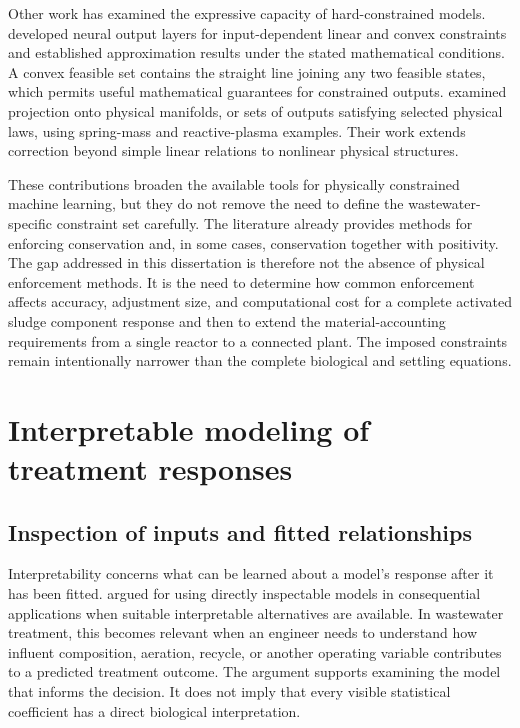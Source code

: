 Other work has examined the expressive capacity of hard-constrained models. \citet{Min2024} developed neural output layers for input-dependent linear and convex constraints and established approximation results under the stated mathematical conditions. A convex feasible set contains the straight line joining any two feasible states, which permits useful mathematical guarantees for constrained outputs. \citet{Valente2025} examined projection onto physical manifolds, or sets of outputs satisfying selected physical laws, using spring-mass and reactive-plasma examples. Their work extends correction beyond simple linear relations to nonlinear physical structures.

These contributions broaden the available tools for physically constrained machine learning, but they do not remove the need to define the wastewater-specific constraint set carefully. The literature already provides methods for enforcing conservation and, in some cases, conservation together with positivity. The gap addressed in this dissertation is therefore not the absence of physical enforcement methods. It is the need to determine how common enforcement affects accuracy, adjustment size, and computational cost for a complete activated sludge component response and then to extend the material-accounting requirements from a single reactor to a connected plant. The imposed constraints remain intentionally narrower than the complete biological and settling equations.

\section{Interpretable modeling of treatment responses}

\subsection{Inspection of inputs and fitted relationships}

Interpretability concerns what can be learned about a model's response after it has been fitted. \citet{Rudin2019} argued for using directly inspectable models in consequential applications when suitable interpretable alternatives are available. In wastewater treatment, this becomes relevant when an engineer needs to understand how influent composition, aeration, recycle, or another operating variable contributes to a predicted treatment outcome. The argument supports examining the model that informs the decision. It does not imply that every visible statistical coefficient has a direct biological interpretation.

